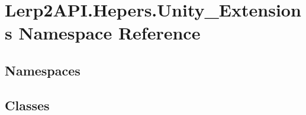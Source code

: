 \hypertarget{namespace_lerp2_a_p_i_1_1_hepers_1_1_unity___extensions}{}\section{Lerp2\+A\+P\+I.\+Hepers.\+Unity\+\_\+\+Extensions Namespace Reference}
\label{namespace_lerp2_a_p_i_1_1_hepers_1_1_unity___extensions}
\subsection*{Namespaces}
\begin{DoxyCompactItemize}
\end{DoxyCompactItemize}
\subsection*{Classes}
